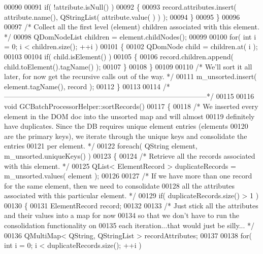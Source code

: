 \begin{DoxyCode}
00090 
00091     \textcolor{keywordflow}{if}( !attribute.isNull() )
00092     \{
00093       record.attributes.insert( attribute.name(), QStringList( attribute.value(
      ) ) );
00094     \}
00095   \}
00096 
00097   \textcolor{comment}{/* Collect all the first level (element) children associated with this
       element. */}
00098   QDomNodeList children = element.childNodes();
00099 
00100   \textcolor{keywordflow}{for}( \textcolor{keywordtype}{int} i = 0; i < children.size(); ++i )
00101   \{
00102     QDomNode child = children.at( i );
00103 
00104     \textcolor{keywordflow}{if}( child.isElement() )
00105     \{
00106       record.children.append( child.toElement().tagName() );
00107     \}
00108   \}
00109 
00110   \textcolor{comment}{/* We'll sort it all later, for now get the recursive calls out of the way. 
      */}
00111   m\_unsorted.insert( element.tagName(), record );
00112 \}
00113 
00114 \textcolor{comment}{/*
      --------------------------------------------------------------------------------------*/}
00115 
00116 \textcolor{keywordtype}{void} GCBatchProcessorHelper::sortRecords()
00117 \{
00118   \textcolor{comment}{/* We inserted every element in the DOM doc into the unsorted map and will
       almost}
00119 \textcolor{comment}{    definitely have duplicates.  Since the DB requires unique element entries
       (elements}
00120 \textcolor{comment}{    are the primary keys), we iterate through the unique keys and consolidate
       the entries}
00121 \textcolor{comment}{    per element. */}
00122   \textcolor{keywordflow}{foreach}( QString element, m\_unsorted.uniqueKeys() )
00123   \{
00124     \textcolor{comment}{/* Retrieve all the records associated with this element. */}
00125     QList< ElementRecord > duplicateRecords = m\_unsorted.values( element );
00126 
00127     \textcolor{comment}{/* If we have more than one record for the same element, then we need to
       consolidate}
00128 \textcolor{comment}{      all the attributes associated with this particular element. */}
00129     \textcolor{keywordflow}{if}( duplicateRecords.size() > 1 )
00130     \{
00131       ElementRecord record;
00132 
00133       \textcolor{comment}{/* Just stick all the attributes and their values into a map for now}
00134 \textcolor{comment}{        so that we don't have to run the consolidation functionality on}
00135 \textcolor{comment}{        each iteration...that would just be silly... */}
00136       QMultiMap< QString, QStringList > recordAttributes;
00137 
00138       \textcolor{keywordflow}{for}( \textcolor{keywordtype}{int} i = 0; i < duplicateRecords.size(); ++i )

\end{DoxyCode}
